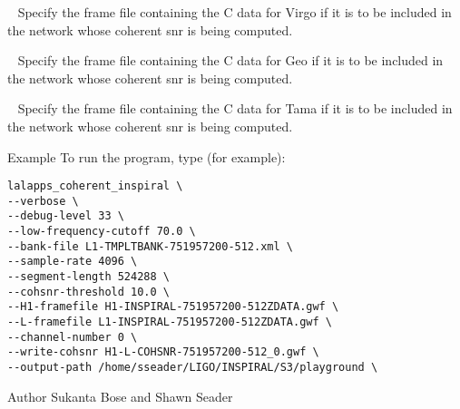 \begin{entry}
\begin{entry}
\item[\option{--V-framefile}~\parm{FILE}] Specify the frame file containing
the C data for Virgo if it is to be included in the network whose coherent snr
is being computed.

\item[\option{--G-framefile}~\parm{FILE}] Specify the frame file containing
the C data for Geo if it is to be included in the network whose coherent snr
is being computed.

\item[\option{--T-framefile}~\parm{FILE}] Specify the frame file containing
the C data for Tama if it is to be included in the network whose coherent snr
is being computed.

\end{entry}

\item[Example]
To run the program, type (for example):
\begin{verbatim}
lalapps_coherent_inspiral \
--verbose \
--debug-level 33 \ 
--low-frequency-cutoff 70.0 \
--bank-file L1-TMPLTBANK-751957200-512.xml \
--sample-rate 4096 \
--segment-length 524288 \
--cohsnr-threshold 10.0 \
--H1-framefile H1-INSPIRAL-751957200-512ZDATA.gwf \
--L-framefile L1-INSPIRAL-751957200-512ZDATA.gwf \
--channel-number 0 \
--write-cohsnr H1-L-COHSNR-751957200-512_0.gwf \
--output-path /home/sseader/LIGO/INSPIRAL/S3/playground \
\end{verbatim} 


\item[Author] Sukanta Bose and Shawn Seader 
\end{entry}
